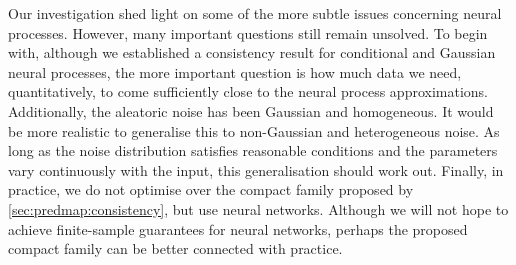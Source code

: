 \documentclass[12pt, twoside]{report}
\begin{document}
Our investigation shed light on some of the more subtle issues concerning neural processes.
However, many important questions still remain unsolved.
To begin with, although we established a consistency result for conditional and Gaussian neural processes, the more important question is how much data we need, quantitatively, to come sufficiently close to the neural process approximations.
Additionally,
the aleatoric noise has been Gaussian and homogeneous.
It would be more realistic to generalise this to non-Gaussian and heterogeneous noise.
As long as the noise distribution satisfies reasonable conditions and the parameters vary continuously with the input, this generalisation should work out.
Finally, in practice, we do not optimise over the compact family proposed by \cref{sec:predmap:consistency}, but use neural networks.
Although we will not hope to achieve finite-sample guarantees for neural networks, perhaps the proposed compact family can be better connected with practice.
\end{document}
